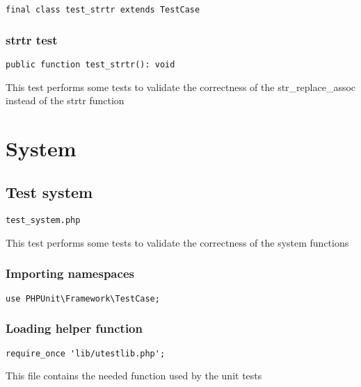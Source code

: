 \documentclass[a4paper]{article}
\begin{document}
\begin{lstlisting}
final class test_strtr extends TestCase
\end{lstlisting}

\hypertarget{toc382}{}
\subsubsection{strtr test}

\begin{lstlisting}
public function test_strtr(): void
\end{lstlisting}

This test performs some tests to validate the correctness
of the str\_replace\_assoc instead of the strtr function


\hypertarget{toc383}{}
\section{System}

\hypertarget{toc384}{}
\subsection{Test system}

\begin{lstlisting}
test_system.php
\end{lstlisting}

This test performs some tests to validate the correctness
of the system functions

\hypertarget{toc385}{}
\subsubsection{Importing namespaces}

\begin{lstlisting}
use PHPUnit\Framework\TestCase;
\end{lstlisting}

\hypertarget{toc386}{}
\subsubsection{Loading helper function}

\begin{lstlisting}
require_once 'lib/utestlib.php';
\end{lstlisting}

This file contains the needed function used by the unit tests

\hypertarget{toc387}{}
\end{document}
